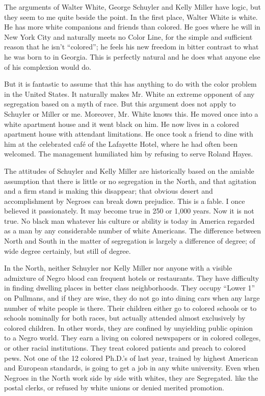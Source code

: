 \documentclass[letterpaper,10pt,english]{jupyterBook}
\begin{document}
\sphinxAtStartPar
The arguments of Walter White, George Schuyler and Kelly Miller have logic, but they seem to me quite beside the point. In the first place, Walter White is white. He has more white companions and friends than colored. He goes where he will in New York City and naturally meets no Color Line, for the simple and sufficient reason that he isn’t “colored”; he feels his new freedom in bitter contrast to what he was born to in Georgia. This is perfectly natural and he does what anyone else of his complexion would do.

\sphinxAtStartPar
But it is fantastic to assume that this has anything to do with the color problem in the United States. It naturally makes Mr. White an extreme opponent of any segregation based on a myth of race. But this argument does not apply to Schuyler or Miller or me. Moreover, Mr. White knows this. He moved once into a white apartment house and it went black on him. He now lives in a colored apartment house with attendant limitations. He once took a friend to dine with him at the celebrated café of the Lafayette Hotel, where he had often been welcomed. The management humiliated him by refusing to serve Roland Hayes.

\sphinxAtStartPar
The attitudes of Schuyler and Kelly Miller are historically based on the amiable assumption that there is little or no segregation in the North, and that agitation and a firm stand is making this disappear; that obvious desert and accomplishment by Negroes can break down prejudice. This is a fable. I once believed it passionately. It may become true in 250 or 1,000 years. Now it is not true. No black man whatever his culture or ability is today in America regarded as a man by any considerable number of white Americans. The difference between North and South in the matter of segregation is largely a difference of degree; of wide degree certainly, but still of degree.

\sphinxAtStartPar
In the North, neither Schuyler nor Kelly Miller nor anyone with a visible admixture of Negro blood can frequent hotels or restaurants. They have difficulty in finding dwelling places in better class neighborhoods. They occupy “Lower 1” on Pullmans, and if they are wise, they do not go into dining cars when any large number of white people is there. Their children either go to colored schools or to schools nominally for both races, but actually attended almost exclusively by colored children. In other words, they are confined by unyielding public opinion to a Negro world. They earn a living on colored newspapers or in colored colleges, or other racial institutions. They treat colored patients and preach to colored pews. Not one of the 12 colored Ph.D.’s of last year, trained by highest American and European standards, is going to get a job in any white university. Even when Negroes in the North work side by side with whites, they are Segregated. like the postal clerks, or refused by white unions or denied merited promotion.
\end{document}
